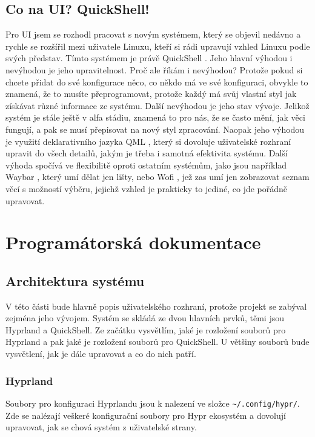 \documentclass[12pt,a4paper]{article}
\begin{document}
\subsection{Co na UI? QuickShell!}
Pro UI jsem se rozhodl pracovat s novým systémem, který se objevil nedávno a rychle se rozšířil mezi uživatele Linuxu,
kteří si rádi upravují vzhled Linuxu podle svých představ. Tímto systémem je právě QuickShell \autocite{Quickshell}.
Jeho hlavní výhodou i nevýhodou je jeho upravitelnost. Proč ale říkám i nevýhodou? Protože pokud si chcete přidat do
své konfigurace něco, co někdo má ve své konfiguraci, obvykle to znamená, že to musíte přeprogramovat, protože každý
má svůj vlastní styl jak získávat různé informace ze systému. Další nevýhodou je jeho stav vývoje. Jelikož systém je
stále ještě v alfa stádiu, znamená to pro nás, že se často mění, jak věci fungují, a pak se musí přepisovat na nový
styl zpracování. Naopak jeho výhodou je využití deklarativního jazyka QML \autocite{QtDocumentation}, který
si dovoluje uživatelské rozhraní upravit do všech detailů, jakým je třeba i samotná efektivita systému. Další výhoda
spočívá ve flexibilitě oproti ostatním systémům, jako jsou například Waybar \autocite{rouillardAlexaysWaybar2026}, 
který umí dělat jen lišty, nebo Wofi \autocite{ScooptaWofiThis},
jež zas umí jen zobrazovat seznam věcí s možností výběru, jejichž vzhled je prakticky to jediné, co jde pořádně upravovat.

\newpage
\section{Programátorská dokumentace}

\subsection{Architektura systému}
V této části bude hlavně popis uživatelského rozhraní, protože projekt se zabýval zejména jeho vývojem.
Systém se skládá ze dvou hlavních prvků, těmi jsou Hyprland a QuickShell. Ze začátku vysvětlím, jaké je rozložení
souborů pro Hyprland a pak jaké je rozložení souborů pro QuickShell. U většiny souborů bude vysvětlení, jak je dále
upravovat a co do nich patří.

\subsubsection{Hyprland}
Soubory pro konfiguraci Hyprlandu jsou k nalezení ve složce \verb|~/.config/hypr/|. Zde se nalézají veškeré konfigurační
soubory pro Hypr ekosystém a dovolují upravovat, jak se chová systém z uživatelské strany. 
\end{document}
